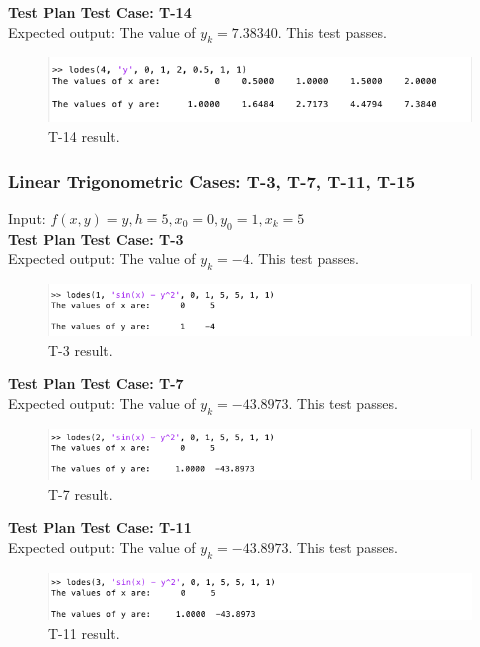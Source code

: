 \documentclass[12pt, titlepage]{article}
\begin{document}
\textbf{Test Plan Test Case: T-14}\\
Expected output: The value of $y_k = 7.38340$. This test passes.\\
\begin{figure}[H]
 \includegraphics[width=\linewidth]{images/T14}
  \caption{T-14 result.}
  \label{fig:T14}
\end{figure}

\subsubsection{Linear Trigonometric Cases: T-3, T-7, T-11, T-15}
Input: $f(x,y) = y, h = 5, x_0 = 0,y_0 = 1,x_k = 5$\\

\textbf{Test Plan Test Case: T-3}\\
Expected output: The value of $y_k = -4$. This test passes.\\
\begin{figure}[H]
 \includegraphics[width=\linewidth]{images/T3}
  \caption{T-3 result.}
  \label{fig:T3}
\end{figure}

\textbf{Test Plan Test Case: T-7}\\
Expected output: The value of $y_k = -43.8973$. This test passes.\\
\begin{figure}[H]
 \includegraphics[width=\linewidth]{images/T7}
  \caption{T-7 result.}
  \label{fig:T7}
\end{figure}

\textbf{Test Plan Test Case: T-11}\\
Expected output: The value of $y_k = -43.8973$. This test passes.\\
\begin{figure}[H]
 \includegraphics[width=\linewidth]{images/T11}
  \caption{T-11 result.}
  \label{fig:T11}
\end{figure}
\end{document}
